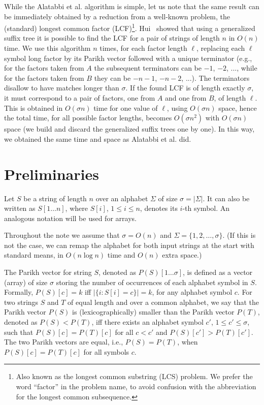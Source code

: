 \documentclass{llncs}
\begin{document}
While the Alatabbi et al. algorithm is simple, 
let us note that the same result can be
immediately obtained by a reduction from a well-known problem, 
the (standard) longest common factor (LCF)\footnote{Also known 
as the longest common substring (LCS) problem. 
We prefer the word ``factor'' in the problem name, to avoid confusion 
with the abbreviation for the longest common subsequence.}.
Hui~\cite{H1992} showed that using a generalized suffix tree it is possible 
to find the LCF for a pair of strings of length $n$ in $O(n)$ time.
We use this algorithm $n$ times, for each factor length $\ell$, 
replacing each $\ell$ symbol long factor by its Parikh vector 
followed with a unique terminator (e.g., for the factors taken from $A$ 
the subsequent terminators can be 
$-1$, $-2$, ..., 
while 
for the factors taken from $B$ they can be 
$-n-1$, $-n-2$, ...).
The terminators disallow to have 
matches 
longer than $\sigma$.
If the found LCF is of length exactly $\sigma$, 
it must correspond to a pair of factors, one from $A$ and one from $B$, 
of length $\ell$.
This is obtained in $O(\sigma n)$ time for one value of $\ell$, 
using $O(\sigma n)$ space, hence the total time, 
for all possible factor lengths, becomes $O(\sigma n^2)$ with 
$O(\sigma n)$ space 
(we build and discard the generalized suffix trees one by one).
In this way, we obtained the same time and space as Alatabbi et al. did.


\section{Preliminaries}
Let $S$ be a string of length $n$ over an alphabet $\Sigma$ of 
size $\sigma = |\Sigma|$.
It can also be written as $S[1 \ldots n]$, where $S[i]$, $1 \leq i \leq n$, 
denotes its $i$-th symbol.
An analogous notation will be used for arrays.

Throughout the note we assume that $\sigma = O(n)$ and 
$\Sigma = \{1, 2, \ldots, \sigma\}$.
(If this is not the case, we can remap the alphabet for both 
input strings at the start with standard means, 
in $O(n\log n)$ time and $O(n)$ extra space.)

The Parikh vector for string $S$, 
denoted as $P(S)[1 \ldots \sigma]$, 
is defined as a vector (array) of size $\sigma$ storing the number 
of occurrences of each alphabet symbol in $S$.
Formally, $P(S)[c] = k$ iff $|\{i: S[i] = c\}| = k$, for any alphabet 
symbol $c$.
For two strings $S$ and $T$ of equal length and over a common alphabet,
we say that the Parikh vector $P(S)$ is (lexicographically) smaller 
than the Parikh vector $P(T)$, denoted as $P(S) < P(T)$, 
iff there exists an alphabet symbol $c'$, $1 \leq c' \leq \sigma$, such that 
$P(S)[c] = P(T)[c]$ for all $c < c'$ and $P(S)[c'] > P(T)[c']$.
The two Parikh vectors are equal, i.e., $P(S) = P(T)$, 
when $P(S)[c] = P(T)[c]$ for all symbols $c$.
\end{document}
